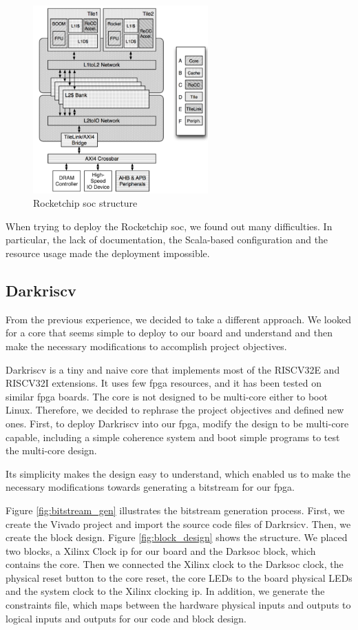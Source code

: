 \begin{figure}[h]
  \centering
  \includegraphics[width=0.6\textwidth]{images/rocket_structure.png}
  \caption{Rocketchip \gls{soc} structure}
  \label{fig:rocketstruct}
\end{figure}

When trying to deploy the Rocketchip \gls{soc}, we found out many difficulties. In particular, the lack of documentation, the Scala-based configuration and the resource usage made the deployment impossible.

\subsection{Darkriscv}
From the previous experience, we decided to take a different approach. We looked for a core that seems simple to deploy to our board and understand and then make the necessary modifications to accomplish project objectives.

Darkriscv\cite{darkriscv} is a tiny and naive core that implements most of the RISCV32E and RISCV32I extensions. It uses few \gls{fpga} resources, and it has been tested on similar \gls{fpga} boards. The core is not designed to be multi-core either to boot Linux. Therefore, we decided to rephrase the project objectives and defined new ones. First, to deploy Darkriscv into our \gls{fpga}, modify the design to be multi-core capable, including a simple coherence system and boot simple programs to test the multi-core design.

Its simplicity makes the design easy to understand, which enabled us to make the necessary modifications towards generating a bitstream for our \gls{fpga}.

Figure \ref{fig:bitstream_gen} illustrates the bitstream generation process. 
First, we create the Vivado project and import the source code files of Darkrsicv.  Then, we create the block design. Figure \ref{fig:block_design} shows the structure. We placed two blocks, a Xilinx Clock \gls{ip} for our board and the Darksoc block, which contains the core. Then we connected the Xilinx clock to the Darksoc clock, the physical reset button to the core reset, the core LEDs to the board physical LEDs and the system clock to the Xilinx clocking \gls{ip}. In addition, we generate the constraints file, which maps between the hardware physical inputs and outputs to logical inputs and outputs for our code and block design.

